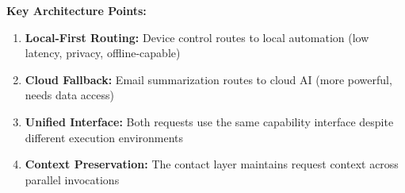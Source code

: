 \textbf{Key Architecture Points:}
\begin{enumerate}[label=\arabic*.]
\item \textbf{Local-First Routing:} Device control routes to local automation (low latency, privacy, offline-capable)
\item \textbf{Cloud Fallback:} Email summarization routes to cloud AI (more powerful, needs data access)
\item \textbf{Unified Interface:} Both requests use the same capability interface despite different execution environments
\item \textbf{Context Preservation:} The contact layer maintains request context across parallel invocations
\end{enumerate}
